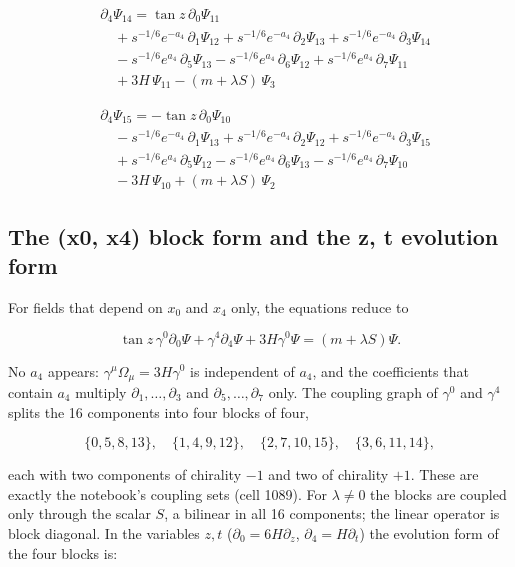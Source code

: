 \documentclass[11pt]{article}
\begin{document}
\[
\begin{aligned}
&\partial_{4}\Psi_{14}=\tan z\,\partial_{0}\Psi_{11} \\
&\quad +s^{-1/6}e^{-a_4}\,\partial_{1}\Psi_{12}+s^{-1/6}e^{-a_4}\,\partial_{2}\Psi_{13}+s^{-1/6}e^{-a_4}\,\partial_{3}\Psi_{14} \\
&\quad -s^{-1/6}e^{a_4}\,\partial_{5}\Psi_{13}-s^{-1/6}e^{a_4}\,\partial_{6}\Psi_{12}+s^{-1/6}e^{a_4}\,\partial_{7}\Psi_{11} \\
&\quad +3H\,\Psi_{11}-(m+\lambda S)\,\Psi_{3}
\end{aligned}\tag{V14}
\]

\[
\begin{aligned}
&\partial_{4}\Psi_{15}=-\tan z\,\partial_{0}\Psi_{10} \\
&\quad -s^{-1/6}e^{-a_4}\,\partial_{1}\Psi_{13}+s^{-1/6}e^{-a_4}\,\partial_{2}\Psi_{12}+s^{-1/6}e^{-a_4}\,\partial_{3}\Psi_{15} \\
&\quad +s^{-1/6}e^{a_4}\,\partial_{5}\Psi_{12}-s^{-1/6}e^{a_4}\,\partial_{6}\Psi_{13}-s^{-1/6}e^{a_4}\,\partial_{7}\Psi_{10} \\
&\quad -3H\,\Psi_{10}+(m+\lambda S)\,\Psi_{2}
\end{aligned}\tag{V15}
\]

\subsection{The (x0, x4) block form and the z, t evolution form}

For fields that depend on $x_0$ and $x_4$ only, the equations reduce to

\[
\tan z\,\gamma^0\partial_0\Psi+\gamma^4\partial_4\Psi+3H\gamma^0\Psi=(m+\lambda S)\Psi .
\]

No $a_4$ appears: $\gamma^\mu\Omega_\mu=3H\gamma^0$ is independent of $a_4$, and the coefficients that contain $a_4$ multiply $\partial_1,\dots,\partial_3$ and $\partial_5,\dots,\partial_7$ only. The coupling graph of $\gamma^0$ and $\gamma^4$ splits the 16 components into four blocks of four,

\[
\{0,5,8,13\},\quad\{1,4,9,12\},\quad\{2,7,10,15\},\quad\{3,6,11,14\},
\]

each with two components of chirality $-1$ and two of chirality $+1$. These are exactly the notebook's coupling sets (cell 1089). For $\lambda\ne0$ the blocks are coupled only through the scalar $S$, a bilinear in all 16 components; the linear operator is block diagonal. In the variables $z,t$ ($\partial_0=6H\partial_z$, $\partial_4=H\partial_t$) the evolution form of the four blocks is:
\end{document}
